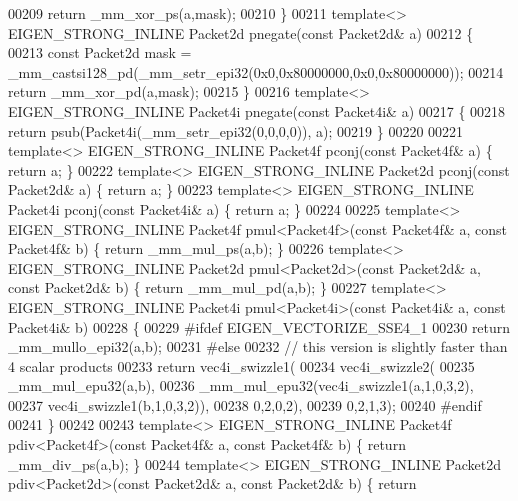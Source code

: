 \begin{DoxyCode}
00209   \textcolor{keywordflow}{return} \_mm\_xor\_ps(a,mask);
00210 \}
00211 \textcolor{keyword}{template}<> EIGEN\_STRONG\_INLINE Packet2d pnegate(\textcolor{keyword}{const} Packet2d& a)
00212 \{
00213   \textcolor{keyword}{const} Packet2d mask = \_mm\_castsi128\_pd(\_mm\_setr\_epi32(0x0,0x80000000,0x0,0x80000000));
00214   \textcolor{keywordflow}{return} \_mm\_xor\_pd(a,mask);
00215 \}
00216 \textcolor{keyword}{template}<> EIGEN\_STRONG\_INLINE Packet4i pnegate(\textcolor{keyword}{const} Packet4i& a)
00217 \{
00218   \textcolor{keywordflow}{return} psub(Packet4i(\_mm\_setr\_epi32(0,0,0,0)), a);
00219 \}
00220 
00221 \textcolor{keyword}{template}<> EIGEN\_STRONG\_INLINE Packet4f pconj(\textcolor{keyword}{const} Packet4f& a) \{ \textcolor{keywordflow}{return} a; \}
00222 \textcolor{keyword}{template}<> EIGEN\_STRONG\_INLINE Packet2d pconj(\textcolor{keyword}{const} Packet2d& a) \{ \textcolor{keywordflow}{return} a; \}
00223 \textcolor{keyword}{template}<> EIGEN\_STRONG\_INLINE Packet4i pconj(\textcolor{keyword}{const} Packet4i& a) \{ \textcolor{keywordflow}{return} a; \}
00224 
00225 \textcolor{keyword}{template}<> EIGEN\_STRONG\_INLINE Packet4f pmul<Packet4f>(\textcolor{keyword}{const} Packet4f& a, \textcolor{keyword}{const} Packet4f& b) \{ \textcolor{keywordflow}{return} 
      \_mm\_mul\_ps(a,b); \}
00226 \textcolor{keyword}{template}<> EIGEN\_STRONG\_INLINE Packet2d pmul<Packet2d>(\textcolor{keyword}{const} Packet2d& a, \textcolor{keyword}{const} Packet2d& b) \{ \textcolor{keywordflow}{return} 
      \_mm\_mul\_pd(a,b); \}
00227 \textcolor{keyword}{template}<> EIGEN\_STRONG\_INLINE Packet4i pmul<Packet4i>(\textcolor{keyword}{const} Packet4i& a, \textcolor{keyword}{const} Packet4i& b)
00228 \{
00229 \textcolor{preprocessor}{#ifdef EIGEN\_VECTORIZE\_SSE4\_1}
00230   \textcolor{keywordflow}{return} \_mm\_mullo\_epi32(a,b);
00231 \textcolor{preprocessor}{#else}
00232   \textcolor{comment}{// this version is slightly faster than 4 scalar products}
00233   \textcolor{keywordflow}{return} vec4i\_swizzle1(
00234             vec4i\_swizzle2(
00235               \_mm\_mul\_epu32(a,b),
00236               \_mm\_mul\_epu32(vec4i\_swizzle1(a,1,0,3,2),
00237                             vec4i\_swizzle1(b,1,0,3,2)),
00238               0,2,0,2),
00239             0,2,1,3);
00240 \textcolor{preprocessor}{#endif}
00241 \}
00242 
00243 \textcolor{keyword}{template}<> EIGEN\_STRONG\_INLINE Packet4f pdiv<Packet4f>(\textcolor{keyword}{const} Packet4f& a, \textcolor{keyword}{const} Packet4f& b) \{ \textcolor{keywordflow}{return} 
      \_mm\_div\_ps(a,b); \}
00244 \textcolor{keyword}{template}<> EIGEN\_STRONG\_INLINE Packet2d pdiv<Packet2d>(\textcolor{keyword}{const} Packet2d& a, \textcolor{keyword}{const} Packet2d& b) \{ \textcolor{keywordflow}{return} 

\end{DoxyCode}
